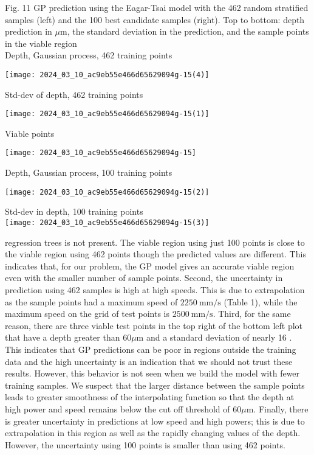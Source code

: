 \documentclass[10pt]{article}
\begin{document}
Fig. 11 GP prediction using the Eagar-Tsai model with the 462 random stratified samples (left) and the 100 best candidate samples (right). Top to bottom: depth prediction in $\mu \mathrm{m}$, the standard deviation in the prediction, and the sample points in the viable region\\
Depth, Gaussian process, 462 training points

\begin{center}
\texttt{[image: 2024\_03\_10\_ac9eb55e466d65629094g-15(4)]}
\end{center}

Std-dev of depth, 462 training points

\begin{center}
\texttt{[image: 2024\_03\_10\_ac9eb55e466d65629094g-15(1)]}
\end{center}

Viable points

\begin{center}
\texttt{[image: 2024\_03\_10\_ac9eb55e466d65629094g-15]}
\end{center}

Depth, Gaussian process, 100 training points

\begin{center}
\texttt{[image: 2024\_03\_10\_ac9eb55e466d65629094g-15(2)]}
\end{center}

Std-dev in depth, 100 training points\\
\texttt{[image: 2024\_03\_10\_ac9eb55e466d65629094g-15(3)]}

regression trees is not present. The viable region using just 100 points is close to the viable region using 462 points though the predicted values are different. This indicates that, for our problem, the GP model gives an accurate viable region even with the smaller number of sample points. Second, the uncertainty in prediction using 462 samples is high at high speeds. This is due to extrapolation as the sample points had a maximum speed of $2250 \mathrm{~mm} / \mathrm{s}$ (Table 1), while the maximum speed on the grid of test points is $2500 \mathrm{~mm} / \mathrm{s}$. Third, for the same reason, there are three viable test points in the top right of the bottom left plot that have a depth greater than $60 \mu \mathrm{m}$ and a standard deviation of nearly 16 . This indicates that GP predictions can be poor in regions outside the training data and the high uncertainty is an indication that we should not trust these results. However, this behavior is not seen when we build the model with fewer training samples. We suspect that the larger distance between the sample points leads to greater smoothness of the interpolating function so that the depth at high power and speed remains below the cut off threshold of $60 \mu \mathrm{m}$. Finally, there is greater uncertainty in predictions at low speed and high powers; this is due to extrapolation in this region as well as the rapidly changing values of the depth. However, the uncertainty using 100 points is smaller than using 462 points.
\end{document}
